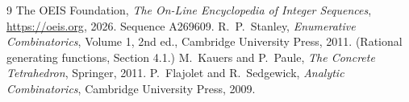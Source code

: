 \documentclass[11pt,a4paper]{article}
\theoremstyle{plain}
\theoremstyle{definition}
\begin{document}
\begin{thebibliography}{9}
 The OEIS Foundation, \emph{The On-Line Encyclopedia of Integer
Sequences}, \url{https://oeis.org}, 2026. Sequence A269609.
 R.~P.~Stanley, \emph{Enumerative Combinatorics}, Volume 1, 2nd ed.,
Cambridge University Press, 2011. (Rational generating functions, Section 4.1.)
 M.~Kauers and P.~Paule, \emph{The Concrete Tetrahedron}, Springer, 2011.
 P.~Flajolet and R.~Sedgewick, \emph{Analytic Combinatorics}, Cambridge
University Press, 2009.
\end{thebibliography}
\end{document}

